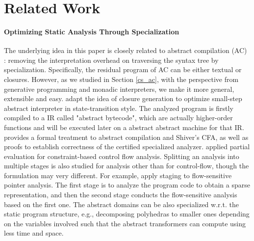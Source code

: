 \section{Related Work}

\paragraph{Optimizing Static Analysis Through Specialization}
The underlying idea in this paper is closely related to abstract compilation (AC)
\cite{Boucher:1996:ACN:647473.727587}: removing the interpretation overhead on
traversing the syntax tree by specialization. Specifically, the residual program
of AC can be either textual or closures. However, as we studied in Section
\ref{cs_ac}, with the perspective from generative programming and monadic
interpreters, we make it more general, extensible and easy.
\citet{Johnson:2013:OAA:2500365.2500604} adapt the idea of closure
generation to optimize small-step abstract interpreter in state-transition
style. The analyzed program is firstly compiled to a IR called "abstract
bytecode", which are actually higher-order functions and will be executed later
on a abstract abstract machine for that IR. \citet{damian1999partial} provides a
formal treatment to abstract compilation and Shiver's CFA, as well as proofs to
establish correctness of the certified specialized analyzer.
\citet{amtoft1999partial} applied partial evaluation for constraint-based
control flow analysis. Splitting an analysis into multiple stages is also
studied for analysis other than for control-flow, though the formulation may
very different. For example, \citet{DBLP:conf/cgo/HardekopfL11} apply staging to
flow-sensitive pointer analysis. The first stage is to analyze the program code
to obtain a sparse representation, and then the second stage conducts the
flow-sensitive analysis based on the first one.
The abstract domains can be also specialized w.r.t. the static program
structure, e.g., decomposing polyhedras \cite{DBLP:conf/popl/SinghPV17,
Singh:2017:PCD:3177123.3158143} to smaller ones depending on the variables
involved such that the abstract transformers can compute using less time and
space.

